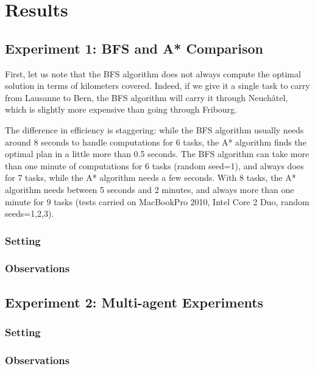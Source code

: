 \documentclass[11pt]{article}
\begin{document}
\section{Results}

\subsection{Experiment 1: BFS and A* Comparison}
First, let us note that the BFS algorithm does not always compute the optimal solution in terms of kilometers covered. Indeed, if we give it a single task to carry from Lausanne to Bern, the BFS algorithm will carry it through Neuchâtel, which is slightly more expensive than going through Fribourg.

The difference in efficiency is staggering: while the BFS algorithm usually needs around 8 seconds to handle computations for 6 tasks, the A* algorithm finds the optimal plan in a little more than 0.5 seconds. The BFS algorithm can take more than one minute of computations for 6 tasks (random seed=1), and always does for 7 tasks, while the A* algorithm needs a few seconds. With 8 tasks, the A* algorithm needs between 5 seconds and 2 minutes, and always more than one minute for 9 tasks (tests carried on MacBookPro 2010, Intel Core 2 Duo, random seeds=1,2,3). 

\subsubsection{Setting}

\subsubsection{Observations}


\subsection{Experiment 2: Multi-agent Experiments}

\subsubsection{Setting}

\subsubsection{Observations}
\end{document}
